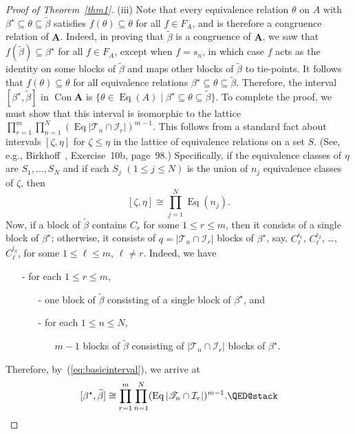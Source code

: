 \documentclass{au}
\numberwithin{equation}{section}
\theoremstyle{plain}
\theoremstyle{definition}
\newcommand{\suchthat}{\ensuremath{\mid}}  %
\newcommand{\<}{\ensuremath{\langle}}
\renewcommand{\>}{\ensuremath{\rangle}}
\newcommand{\bA}{\ensuremath{\mathbf{A}}}
\newcommand{\sT}{\ensuremath{\mathscr{T}}}
\newcommand{\sI}{\ensuremath{\mathcal{I}}}
\DeclareMathOperator{\Eq}{Eq}
\DeclareMathOperator{\Con}{Con}
\renewcommand{\leq}{\ensuremath{\leqslant}}
\newcommand{\tbeta}{\ensuremath{\widetilde{\beta}}}
\begin{document}
\begin{proof}[Proof of Theorem~\ref{thm1}]
\smallskip %
(iii)
Note that every equivalence relation $\theta$ on $A$ with
$\beta^\star \subseteq \theta \subseteq \tbeta$ satisfies
$f(\theta)\subseteq \theta$ for all $f\in F_A$, and is therefore a congruence
relation of $\bA$. Indeed, in proving that $\tbeta$ is a congruence of $\bA$,
we saw that $f(\tbeta)\subseteq \beta^\star$ for all $f\in F_A$, except when $f
= s_n$, in which case $f$ acts as the identity on some blocks of $\tbeta$ and
maps other blocks of $\tbeta$ to tie-points.  It follows that
$f(\theta)\subseteq \theta$ for all equivalence relations
$\beta^\star \subseteq \theta \subseteq \tbeta$.
Therefore, the interval $[\beta^\star, \tbeta]$ in $\Con\bA$ is
$\{\theta \in \Eq(A) \suchthat \beta^\star \subseteq \theta \subseteq \tbeta \}$.
To complete the proof, we must show that this interval is isomorphic to the lattice
$\prod_{r=1}^m \prod_{n=1}^N (\Eq |\sT_n \cap \sI_r|)^{m-1}$.
This follows from a standard fact about intervals $[\zeta, \eta]$ for $\zeta\leq
\eta$ in the lattice of equivalence relations on a set $S$. (See, e.g.,
Birkhoff~\cite{Birkhoff:1995}, Exercise~10b, page~98.)
Specifically, if the equivalence classes of $\eta$ are $S_1, \dots, S_N$ and if
each $S_j$ $(1\leq j \leq N)$ is the union of $n_j$ equivalence classes of
$\zeta$, then  %
\begin{equation}
  \label{eq:basicinterval}
[\zeta, \eta] \cong \prod_{j=1}^N \Eq(n_j).
\end{equation}
Now, if a block of $\tbeta$ contains $C_r$ for some $1\leq r \leq m$, then it
consists of a single block of $\beta^\star$; otherwise, it consists of
$q = |\sT_n\cap \sI_r|$ blocks of $\beta^\star$, say,
$C^{i_1}_{\ell}$, $C^{i_2}_{\ell}$, \dots, $C^{i_q}_{\ell}$,
 for some $1\leq \ell \leq m$, $\ell \neq r$.
Indeed, we have
\begin{itemize}
\item[-] for each $1\leq r \leq m$,
\begin{itemize}
\item[-]  one block of $\tbeta$ consisting of a single block of $\beta^\star$, and
\item[-] for each $1\leq n \leq N$,
\begin{itemize}
\item[] $m-1$ blocks of $\tbeta$ consisting of
 $|\sT_n\cap \sI_r|$ blocks of $\beta^\star$.  %
\end{itemize}
\end{itemize}
\end{itemize}
 Therefore, by~(\ref{eq:basicinterval}), we arrive at
 \[
[\beta^\star,\tbeta] \cong
\prod_{r=1}^m \prod_{n=1}^N (\Eq |\sT_n \cap \sI_r|)^{m-1}.\qedhere %
 \]
\end{proof}
\end{document}

